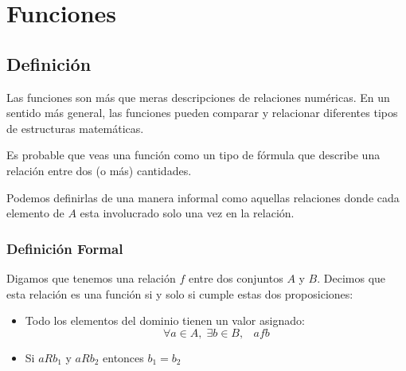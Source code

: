 \documentclass[12pt, fleqn]{report}                             %
\DeclareMathOperator \Space {\quad}                             %
\DeclareMathOperator \MiniSpace {\;}                            %
\begin{document}
    \chapter{Funciones}
        \clearpage    



        \section{Definición}

            Las funciones son más que meras descripciones de relaciones numéricas. En un sentido más general,
            las funciones pueden comparar y relacionar diferentes tipos de estructuras matemáticas.

            Es probable que veas una función como un tipo de fórmula que describe una relación entre dos
            (o más) cantidades.

            Podemos definirlas de una manera informal como aquellas relaciones donde cada elemento de $A$ 
            esta involucrado solo una vez en la relación.

            \subsection*{Definición Formal}

                Digamos que tenemos una relación $f$ entre dos conjuntos $A$ y $B$.
                Decimos que esta relación es una función si y solo si cumple estas dos proposiciones:

                \begin{itemize}
                    \item Todo los elementos del dominio tienen un valor asignado:
                        \begin{equation*}
                            \forall a \in A, \; \exists b \in B, \MiniSpace afb
                        \end{equation*}

                    \item Si $aRb_1$ y $aRb_2$ entonces $b_1 = b_2$

                \end{itemize}
\end{document}
